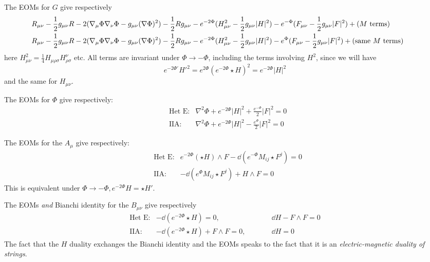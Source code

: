 \documentclass[11pt, class=article, crop=false]{standalone}
\begin{document}
\begin{enumerate}
	
	The EOMs for $G$ give respectively
	\[
	\hspace{-.3in}
		\begin{aligned}
			&R_{\mu \nu} - \frac12 g_{\mu \nu} R - 2 (\nabla_{\mu} \Phi \nabla_\nu \Phi - g_{\mu \nu} (\nabla \Phi)^2 ) - \frac12 R g_{\mu \nu} - e^{-2 \Phi} (H^2_{\mu \nu} - \frac12 g_{\mu \nu} |H|^2) - e^{-\Phi} (F_{\mu \nu}- \frac12 g_{\mu \nu} |F|^2) + (M \text{ terms})\\
			&R_{\mu \nu} - \frac12 g_{\mu \nu} R - 2 (\nabla_{\mu} \Phi \nabla_\nu \Phi - g_{\mu \nu} (\nabla \Phi)^2 ) - \frac12 R g_{\mu \nu} - e^{-2 \Phi} (H^2_{\mu \nu} - \frac12 g_{\mu \nu} |H|^2) - e^{\Phi} (F_{\mu \nu}- \frac12 g_{\mu \nu} |F|^2) + (\text{same } M \text{ terms})\\
		\end{aligned}
	\]
	here $H^2_{\mu \nu} = \frac{1}{4} H_{\mu \rho \sigma} H^{\nu}_{\rho \sigma}$ etc. All terms are invariant under $\Phi \to - \Phi$, including the terms involving $H^2$, since we will have
	\[
		e^{-2\Phi'} {H'}^2 = e^{2 \Phi} (e^{-2\Phi} \star H)^2 = e^{-2 \Phi} |H|^2
	\]
	and the same for $H_{\mu \nu}$.

	The EOMs for $\Phi$ give respectively:
	\[
	\begin{aligned}
		&\text{Het E:} & \nabla^2 \Phi + e^{-2\Phi} |H|^2  + \frac{e^{-\Phi}}{2} |F|^2 = 0\\
		&\text{IIA:} & \nabla^2 \Phi + e^{-2\Phi} |H|^2  - \frac{e^{\Phi}}{2} |F|^2 = 0
	\end{aligned}
	\]
	
	The EOMs for the $A_\mu$ give respectively:
	\[
	\begin{aligned}
		& \text{Het E:}& e^{-2 \Phi} (\star H) \wedge F - \dd(e^{-\Phi} M_{ij} \star F^j) = 0\\
		& \text{IIA:}&-\dd(e^{\Phi} M_{ij} \star F^j) + H \wedge F  = 0
	\end{aligned}
	\]
	This is equivalent under $\Phi \to - \Phi, e^{-2\Phi} H = \star H'$.
	
	The EOMs \emph{and} Bianchi identity for the $B_{\mu \nu}$ give respectively 
	\[
	\begin{aligned}
		& \text{Het E:}& -\dd (e^{-2 \Phi} \star H) = 0, &\qquad &\dd H - F \wedge F = 0 &\\
		& \text{IIA:}& -\dd (e^{-2 \Phi} \star H) + F \wedge F = 0, &\qquad  &\dd H = 0 &
	\end{aligned}
	\]
	The fact that the $H$ duality exchanges the Bianchi identity and the EOMs speaks to the fact that it is an \emph{electric-magnetic duality of strings}.


\end{enumerate}
\end{document}
